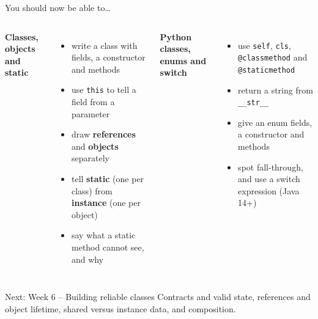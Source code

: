 \documentclass[aspectratio=169]{beamer}
\newcommand{\code}[1]{\texttt{#1}}
\newcommand{\neutrallabel}[1]{\textcolor{bkblue}{\textbf{#1}}}
\newcommand{\yes}{\textcolor{goodgreen}{\ding{51}}}
\begin{document}
\begin{frame}{You should now be able to\ldots}
  \begin{columns}[T,onlytextwidth]
    \neutrallabel{Classes, objects and static}
    \begin{itemize}[itemsep=0.12em]
      \small
      \item[\yes] write a class with fields, a constructor and methods
      \item[\yes] use \code{this} to tell a field from a parameter
      \item[\yes] draw \textbf{references} and \textbf{objects} separately
      \item[\yes] tell \textbf{static} (one per class) from \textbf{instance} (one per object)
      \item[\yes] say what a static method cannot see, and why
    \end{itemize}
    \neutrallabel{Python classes, enums and switch}
    \begin{itemize}[itemsep=0.12em]
      \small
      \item[\yes] use \code{self}, \code{cls}, \code{@classmethod} and \code{@staticmethod}
      \item[\yes] return a string from \code{\_\_str\_\_}
      \item[\yes] give an enum fields, a constructor and methods
      \item[\yes] spot fall-through, and use a switch expression (Java 14+)
    \end{itemize}
  \end{columns}
  \vspace{0.3em}
  \begin{contextbox}{Next: Week 6 -- Building reliable classes}
    \footnotesize Contracts and valid state, references and object lifetime, shared
    versus instance data, and composition.
  \end{contextbox}
\end{frame}
\end{document}
